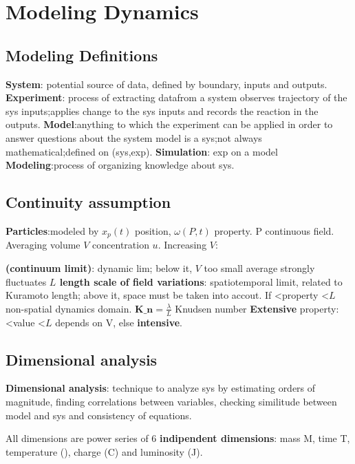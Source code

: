 \section{Modeling Dynamics}

\subsection*{Modeling Definitions}
\textbf{System}: potential source of data, defined by boundary, inputs and outputs.
\textbf{Experiment}: process of extracting datafrom a system \textrightarrow{} observes trajectory of the sys inputs;applies change to the sys inputs and records the reaction in the outputs.
\textbf{Model}:anything to which the experiment can be applied in order to answer questions about the system \textrightarrow{} model is a sys;not always mathematical;defined on (sys,exp).
\textbf{Simulation}: exp on a model
\textbf{Modeling}:process of organizing knowledge about sys.

\subsection*{Continuity assumption}

\textbf{Particles}:modeled by $x_p(t)$ position, $\omega(P,t)$ property.
\textuptarrow{} P \textrightarrow{} continuous field.
Averaging volume $V$ \textrightarrow{} concentration $u$. Increasing $V$:
\begin{comment}

\end{comment}
\textbf{\lambda (continuum limit)}: dynamic lim; below it, $V$ too small \textrightarrow average strongly fluctuates
\textbf{$L$ length scale of field variations}: spatiotemporal limit, related to Kuramoto length; above it, space must be taken into accout. If \lambda \textless property \textless $L$ \textrightarrow non-spatial dynamics domain. 
$\textbf{K_n}=\frac{\lambda}{L}$ Knudsen number
\textbf{Extensive} property: \lambda \textless value \textless $L$ depends on V, else \textbf{intensive}.

\subsection*{Dimensional analysis}
\textbf{Dimensional analysis}: technique to analyze sys by estimating orders of magnitude, finding correlations between variables, checking similitude between model and sys and consistency of equations.

All dimensions are power series of 6 \textbf{indipendent dimensions}: mass M, time T, temperature (\theta), charge (C) and luminosity (J).

